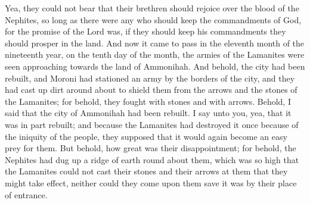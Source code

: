 \bverse \iffalse Yea, they could not bear that their brethren should rejoice over the blood of the Nephites, so long as there were any who should keep the commandments of God, for the promise of the Lord was, if they should keep his commandments they should prosper in the land. \fi
Yea, they could not bear that their brethren should rejoice over the blood of the Nephites, so long as there were any who should keep the commandments of God, for the promise of the Lord was, if they should keep his commandments they should prosper in the land.
\bchapter
\bverse \iffalse And now it came to pass in the eleventh month of the nineteenth year, on the tenth day of the month, the armies of the Lamanites were seen approaching towards the land of Ammonihah. \fi
And now it came to pass in the eleventh month of the nineteenth year, on the tenth day of the month, the armies of the Lamanites were seen approaching towards the land of Ammonihah.
\bverse \iffalse And behold, the city had been rebuilt, and Moroni had stationed an army by the borders of the city, and they had cast up dirt around about to shield them from the arrows and the stones of the Lamanites; for behold, they fought with stones and with arrows. \fi
And behold, the city had been rebuilt, and Moroni had stationed an army by the borders of the city, and they had cast up dirt around about to shield them from the arrows and the stones of the Lamanites; for behold, they fought with stones and with arrows.
\bverse \iffalse Behold, I said that the city of Ammonihah had been rebuilt. I say unto you, yea, that it was in part rebuilt; and because the Lamanites had destroyed it once because of the iniquity of the people, they supposed that it would again become an easy prey for them. \fi
Behold, I said that the city of Ammonihah had been rebuilt. I say unto you, yea, that it was in part rebuilt; and because the Lamanites had destroyed it once because of the iniquity of the people, they supposed that it would again become an easy prey for them.
\bverse \iffalse But behold, how great was their disappointment; for behold, the Nephites had dug up a ridge of earth round about them, which was so high that the Lamanites could not cast their stones and their arrows at them that they might take effect, neither could they come upon them save it was by their place of entrance. \fi
But behold, how great was their disappointment; for behold, the Nephites had dug up a ridge of earth round about them, which was so high that the Lamanites could not cast their stones and their arrows at them that they might take effect, neither could they come upon them save it was by their place of entrance.
